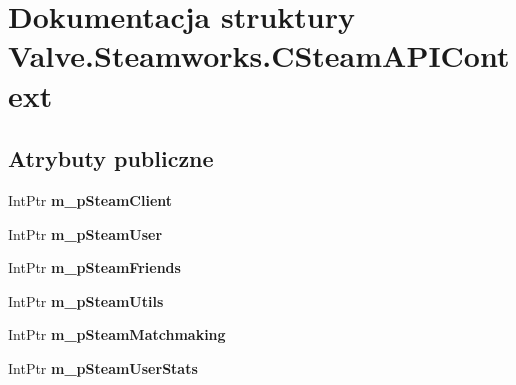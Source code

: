 \hypertarget{struct_valve_1_1_steamworks_1_1_c_steam_a_p_i_context}{}\section{Dokumentacja struktury Valve.\+Steamworks.\+C\+Steam\+A\+P\+I\+Context}
\label{struct_valve_1_1_steamworks_1_1_c_steam_a_p_i_context}
\subsection*{Atrybuty publiczne}
\begin{DoxyCompactItemize}
\item 
\mbox{\label{struct_valve_1_1_steamworks_1_1_c_steam_a_p_i_context_a729873cd1da0db2780102afeff178a7b}} 
Int\+Ptr {\bfseries m\+\_\+p\+Steam\+Client}
\item 
\mbox{\label{struct_valve_1_1_steamworks_1_1_c_steam_a_p_i_context_ad9423fe4dabf6ee498b1cc87f1e3e715}} 
Int\+Ptr {\bfseries m\+\_\+p\+Steam\+User}
\item 
\mbox{\label{struct_valve_1_1_steamworks_1_1_c_steam_a_p_i_context_a569a296b7a600aabf289d1e03f368c27}} 
Int\+Ptr {\bfseries m\+\_\+p\+Steam\+Friends}
\item 
\mbox{\label{struct_valve_1_1_steamworks_1_1_c_steam_a_p_i_context_aea35e3d24e3a71078fc32462d9ec002a}} 
Int\+Ptr {\bfseries m\+\_\+p\+Steam\+Utils}
\item 
\mbox{\label{struct_valve_1_1_steamworks_1_1_c_steam_a_p_i_context_ab173ff7ae728ffc2a95cbf49ca439ca3}} 
Int\+Ptr {\bfseries m\+\_\+p\+Steam\+Matchmaking}
\item 
\mbox{\label{struct_valve_1_1_steamworks_1_1_c_steam_a_p_i_context_a48cb26866eea4e01d638a723a185ae52}} 
Int\+Ptr {\bfseries m\+\_\+p\+Steam\+User\+Stats}
\item 
\mbox{\label{struct_valve_1_1_steamworks_1_1_c_steam_a_p_i_context_a6e83c10638d00aab1701c6978bac0d2f}} 

\end{DoxyCompactItemize}
